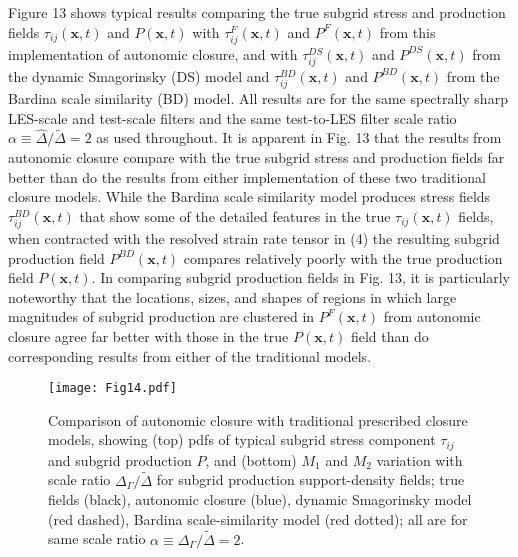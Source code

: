 Figure 13 shows typical results comparing the true subgrid stress and production fields $\tau_{ij}(\mathbf{x},t)$  and  $P(\mathbf{x},t)$ with  $\tau_{ij}^{F}(\mathbf{x},t)$  and  $P^{F}(\mathbf{x},t)$   from this implementation of autonomic closure, and with  $\tau_{ij}^{DS}(\mathbf{x},t)$  and  $P^{DS}(\mathbf{x},t)$   from the dynamic Smagorinsky (DS) model and   $\tau_{ij}^{BD}(\mathbf{x},t)$  and  $P^{BD}(\mathbf{x},t)$  from the Bardina scale similarity (BD) model. All results are for the same spectrally sharp LES-scale and test-scale filters and the same test-to-LES filter scale ratio $\alpha \equiv \widehat{\Delta}/ \widetilde{\Delta} = 2$  as used throughout. It is apparent in Fig. 13 that the results from autonomic closure compare with the true subgrid stress and production fields far better than do the results from either implementation of these two traditional closure models. While the Bardina scale similarity model produces stress fields  $\tau_{ij}^{BD}(\mathbf{x},t)$  that show some of the detailed features in the true $\tau_{ij}(\mathbf{x},t)$ fields, when contracted with the resolved strain rate tensor in (4) the resulting subgrid production field $P^{BD}(\mathbf{x},t)$ compares relatively poorly with the true production field $P(\mathbf{x},t)$. In comparing subgrid production fields in Fig. 13, it is particularly noteworthy that the locations, sizes, and shapes of regions in which large magnitudes of subgrid production are clustered in $P^{F}(\mathbf{x},t)$  from autonomic closure agree far better with those in the true  $P(\mathbf{x},t)$ field than do corresponding results from either of the traditional models. 

%
\begin{figure}
	\begin{center}
	\texttt{[image: Fig14.pdf]}
	\caption{ Comparison of autonomic closure with traditional prescribed closure models, showing (top) pdfs of typical subgrid stress component $\tau_{ij}$ and subgrid production $P$, and (bottom) $M_1$ and $M_2$ variation with scale ratio $\Delta_{\Gamma} / \widetilde{\Delta}$ for subgrid production support-density fields; true fields (black), autonomic closure (blue), dynamic Smagorinsky model (red dashed), Bardina scale-similarity model (red dotted); all are for same scale ratio $\alpha \equiv \Delta_{\Gamma} / \widetilde{\Delta} = 2$.}
	\label{F:14}
	\end{center}
\end{figure}
%
%

